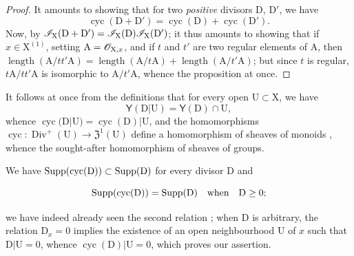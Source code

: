\begin{proof}
It amounts to showing that for two \emph{positive} divisors $\mathrm{D}$, $\mathrm{D}'$, we have
\[
  \operatorname{cyc}(\mathrm{D}+\mathrm{D}')=\operatorname{cyc}(\mathrm{D})+\operatorname{cyc}(\mathrm{D}').
\]
Now, by  $\mathscr{I}_\mathrm{X}(\mathrm{D}+\mathrm{D}')=\mathscr{I}_\mathrm{X}(\mathrm{D})\mathscr{I}_\mathrm{X}(\mathrm{D}')$;
it thus amounts to showing that if $x\in\mathrm{X}^{(1)}$, setting $\mathrm{A}=\mathscr{O}_{\mathrm{X},x}$, and if $t$ and $t'$ are two regular elements of $\mathrm{A}$, then $\operatorname{length}(\mathrm{A}/tt'\mathrm{A})=\operatorname{length}(\mathrm{A}/t\mathrm{A})+\operatorname{length}(\mathrm{A}/t'\mathrm{A})$;
but since $t$ is regular, $t\mathrm{A}/tt'\mathrm{A}$ is isomorphic to $\mathrm{A}/t'\mathrm{A}$, whence the proposition at once.
\end{proof}

It follows at once from the definitions that for every open $\mathrm{U}\subset\mathrm{X}$, we have
\[
  \boldsymbol{\mathsf{Y}}(\mathrm{D}|\mathrm{U})=\boldsymbol{\mathsf{Y}}(\mathrm{D})\cap\mathrm{U},
\]
whence $\operatorname{cyc}(\mathrm{D}|\mathrm{U})=\operatorname{cyc}(\mathrm{D})|\mathrm{U}$, and the homomorphisms $\operatorname{cyc}:\operatorname{Div}^+(\mathrm{U})\to\mathfrak{Z}^1(\mathrm{U})$ define a homomorphism of sheaves of monoids , whence the sought-after homomorphism  of sheaves of groups.

We have $\operatorname{Supp}(\operatorname{cyc}(\mathrm{D}))\subset\operatorname{Supp}(\mathrm{D})$ for every divisor $\mathrm{D}$ and
\begin{env}[21.6.6.2]
\label{IV.21.6.6.2}
\[
  \operatorname{Supp}(\operatorname{cyc}(\mathrm{D}))=\operatorname{Supp}(\mathrm{D})\quad\text{when}\quad\mathrm{D}\geq 0;
\]
\end{env}
we have indeed already seen the second relation ;
when $\mathrm{D}$ is arbitrary, the relation $\mathrm{D}_x=0$ implies the existence of an open neighbourhood $\mathrm{U}$ of $x$ such that $\mathrm{D}|\mathrm{U}=0$, whence $\operatorname{cyc}(\mathrm{D})|\mathrm{U}=0$, which proves our assertion.


